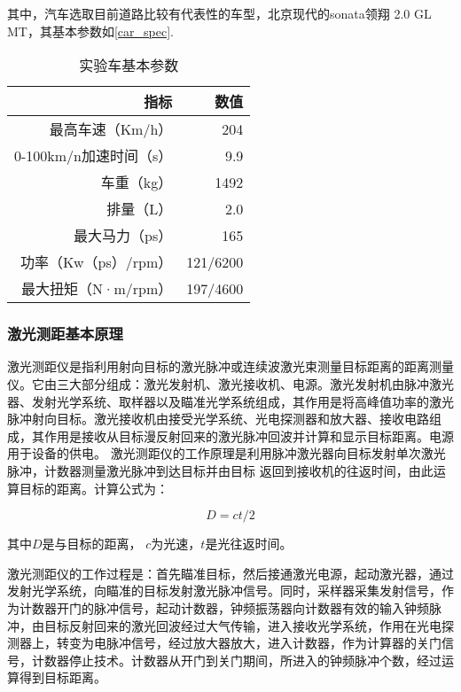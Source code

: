 其中，汽车选取目前道路比较有代表性的车型，北京现代的sonata领翔 2.0 GL MT，其基本参数如\autoref{car_spec}.


\begin{table}[htbp]
  \centering
  \caption{实验车基本参数}
    \begin{tabular}{rr}
    \addlinespace
    \toprule
	指标&	数值\\
	\midrule
    最高车速（Km/h） & 204 \\
    0-100km/n加速时间（s） & 9.9 \\
    车重（kg）    & 1492 \\
    排量（L） & 2.0  \\
    最大马力（ps） & 165 \\
    功率（Kw（ps）/rpm） & 121/6200 \\
    最大扭矩（N·m/rpm） & 197/4600 \\
    \bottomrule
    \end{tabular}%
  \label{car_spec}%
\end{table}%


\subsubsection{激光测距基本原理}
激光测距仪是指利用射向目标的激光脉冲或连续波激光束测量目标距离的距离测量仪。它由三大部分组成：激光发射机、激光接收机、电源。激光发射机由脉冲激光器、发射光学系统、取样器以及瞄准光学系统组成，其作用是将高峰值功率的激光脉冲射向目标。激光接收机由接受光学系统、光电探测器和放大器、接收电路组成，其作用是接收从目标漫反射回来的激光脉冲回波并计算和显示目标距离。电源用于设备的供电。
激光测距仪的工作原理是利用脉冲激光器向目标发射单次激光脉冲，计数器测量激光脉冲到达目标并由目标 返回到接收机的往返时间，由此运算目标的距离。计算公式为：

\begin{equation}
D = ct/2
\end{equation}

其中$D$是与目标的距离， $c$为光速，$t$是光往返时间。

激光测距仪的工作过程是：首先瞄准目标，然后接通激光电源，起动激光器，通过发射光学系统，向瞄准的目标发射激光脉冲信号。同时，采样器采集发射信号，作为计数器开门的脉冲信号，起动计数器，钟频振荡器向计数器有效的输入钟频脉冲，由目标反射回来的激光回波经过大气传输，进入接收光学系统，作用在光电探测器上，转变为电脉冲信号，经过放大器放大，进入计数器，作为计算器的关门信号，计数器停止技术。计数器从开门到关门期间，所进入的钟频脉冲个数，经过运算得到目标距离。


